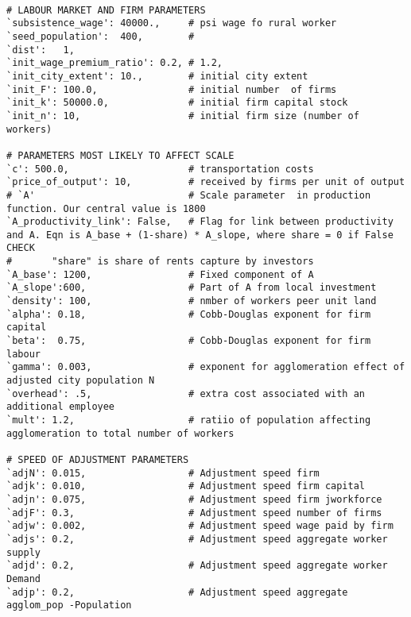 {\small\begin{verbatim} 

# LABOUR MARKET AND FIRM PARAMETERS
`subsistence_wage': 40000.,     # psi wage fo rural worker
`seed_population':  400,        # 
`dist':   1, 
`init_wage_premium_ratio': 0.2, # 1.2,
`init_city_extent': 10.,        # initial city extent
`init_F': 100.0,                # initial number  of firms
`init_k': 50000.0,              # initial firm capital stock 
`init_n': 10,                   # initial firm size (number of workers)

# PARAMETERS MOST LIKELY TO AFFECT SCALE
`c': 500.0,                     # transportation costs
`price_of_output': 10,          # received by firms per unit of output
# `A'                           # Scale parameter  in production function. Our central value is 1800
`A_productivity_link': False,   # Flag for link between productivity and A. Eqn is A_base + (1-share) * A_slope, where share = 0 if False CHECK
#       "share" is share of rents capture by investors 
`A_base': 1200,                 # Fixed component of A
`A_slope':600,                  # Part of A from local investment 
`density': 100,                 # nmber of workers peer unit land
`alpha': 0.18,                  # Cobb-Douglas exponent for firm capital
`beta':  0.75,                  # Cobb-Douglas exponent for firm labour
`gamma': 0.003,                 # exponent for agglomeration effect of adjusted city population N
`overhead': .5,                 # extra cost associated with an additional employee 
`mult': 1.2,                    # ratiio of population affecting agglomeration to total number of workers 

# SPEED OF ADJUSTMENT PARAMETERS 
`adjN': 0.015,                  # Adjustment speed firm
`adjk': 0.010,                  # Adjustment speed firm capital
`adjn': 0.075,                  # Adjustment speed firm jworkforce
`adjF': 0.3,                    # Adjustment speed number of firms
`adjw': 0.002,                  # Adjustment speed wage paid by firm
`adjs': 0.2,                    # Adjustment speed aggregate worker supply 
`adjd': 0.2,                    # Adjustment speed aggregate worker Demand 
`adjp': 0.2,                    # Adjustment speed aggregate agglom_pop -Population


\end{verbatim}}
